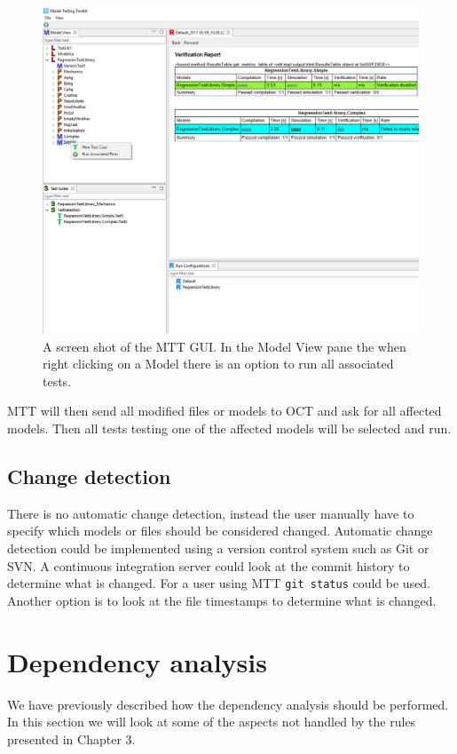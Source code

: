 \documentclass{cslthse-msc}
\begin{document}
\begin{figure}[!hbtp]
    \includegraphics[width=1.0\textwidth]{Pictures/MTT_Capture.png}
    \caption{A screen shot of the MTT GUI. In the Model View pane the when right clicking on a Model there is an option to run all associated tests.}
    \label{fig:MTTrun}
\end{figure}

MTT will then send all modified files or models to OCT and ask for all affected models. Then all tests testing one of the affected models will be selected and run.

\subsection{Change detection}
There is no automatic change detection, instead the user manually have to specify which models or files should be considered changed. Automatic change detection could be implemented using a version control system such as Git or SVN. A continuous integration server could look at the commit history to determine what is changed. For a user using MTT \texttt{git status} could be used. Another option is to look at the file timestamps to determine what is changed.

\section{Dependency analysis}
We have previously described how the dependency analysis should be performed. In this section we will look at some of the aspects not handled by the rules presented in Chapter 3.
\end{document}

